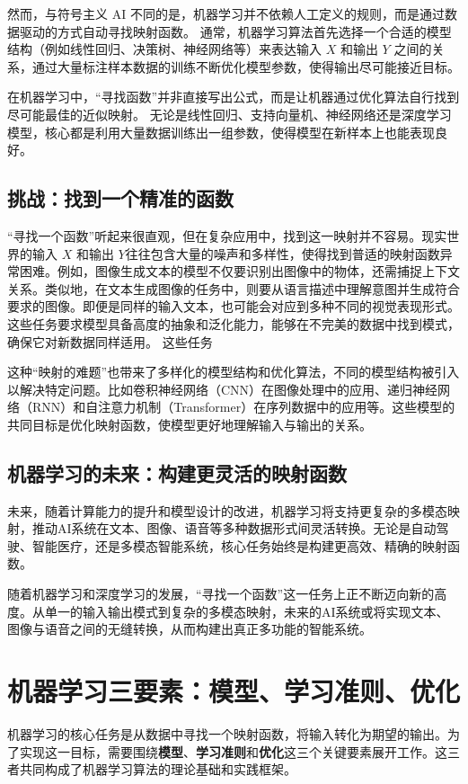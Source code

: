然而，与符号主义 AI 不同的是，机器学习并不依赖人工定义的规则，而是通过数据驱动的方式自动寻找映射函数。
通常，机器学习算法首先选择一个合适的模型结构（例如线性回归、决策树、神经网络等）来表达输入 $X$ 和输出 $Y$ 之间的关系，通过大量标注样本数据的训练不断优化模型参数，使得输出尽可能接近目标。

在机器学习中，“寻找函数”并非直接写出公式，而是让机器通过优化算法自行找到尽可能最佳的近似映射。
无论是线性回归、支持向量机、神经网络还是深度学习模型，核心都是利用大量数据训练出一组参数，使得模型在新样本上也能表现良好。

\subsection{ 挑战：找到一个精准的函数}
“寻找一个函数”听起来很直观，但在复杂应用中，找到这一映射并不容易。现实世界的输入 $X$ 和输出 $Y$往往包含大量的噪声和多样性，使得找到普适的映射函数异常困难。例如，图像生成文本的模型不仅要识别出图像中的物体，还需捕捉上下文关系。类似地，在文本生成图像的任务中，则要从语言描述中理解意图并生成符合要求的图像。即便是同样的输入文本，也可能会对应到多种不同的视觉表现形式。
这些任务要求模型具备高度的抽象和泛化能力，能够在不完美的数据中找到模式，确保它对新数据同样适用。
这些任务

这种“映射的难题”也带来了多样化的模型结构和优化算法，不同的模型结构被引入以解决特定问题。比如卷积神经网络（CNN）在图像处理中的应用、递归神经网络（RNN）和自注意力机制（Transformer）在序列数据中的应用等。这些模型的共同目标是优化映射函数，使模型更好地理解输入与输出的关系。

\subsection{机器学习的未来：构建更灵活的映射函数}
未来，随着计算能力的提升和模型设计的改进，机器学习将支持更复杂的多模态映射，推动AI系统在文本、图像、语音等多种数据形式间灵活转换。无论是自动驾驶、智能医疗，还是多模态智能系统，核心任务始终是构建更高效、精确的映射函数。

随着机器学习和深度学习的发展，“寻找一个函数”这一任务上正不断迈向新的高度。从单一的输入输出模式到复杂的多模态映射，未来的AI系统或将实现文本、图像与语音之间的无缝转换，从而构建出真正多功能的智能系统。

\section{机器学习三要素：模型、学习准则、优化}
机器学习的核心任务是从数据中寻找一个映射函数，将输入转化为期望的输出。为了实现这一目标，需要围绕{\bf 模型}、{\bf 学习准则}和{\bf 优化}这三个关键要素展开工作。这三者共同构成了机器学习算法的理论基础和实践框架。

